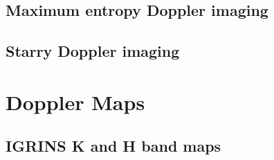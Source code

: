 \documentclass[twocolumn]{aastex631}
\begin{document}
\subsection{Maximum entropy Doppler imaging}

\subsection{Starry Doppler imaging}


\section{Doppler Maps}

\subsection{IGRINS K and H band maps}

\iffalse
\begin{figure*}
    \script{doppler_imaging.py}
    \centering
    \begin{minipage}[b]{0.18\textwidth}
        \centering
        \texttt{[image: figures/solver1.pdf]}
        \label{fig:solver1}
     \end{minipage}
     \hfill
     \begin{minipage}[b]{0.18\textwidth}
         \centering
         \texttt{[image: figures/solver2.pdf]}
         \label{fig:solver2}
     \end{minipage}
     \hfill
     \begin{minipage}[b]{0.18\textwidth}
         \centering
         \texttt{[image: figures/solver3.pdf]}
         \label{fig:solver3}
     \end{minipage}
     \hfill
     \begin{minipage}[b]{0.18\textwidth}
         \centering
         \texttt{[image: figures/solver4.pdf]}
         \label{fig:solver4}
     \end{minipage}
     \hfill
     \begin{minipage}[b]{0.18\textwidth}
         \centering
         \texttt{[image: figures/solver5.pdf]}
         \label{fig:solver5}
     \end{minipage}
\end{figure*} 
\fi
\end{document}
